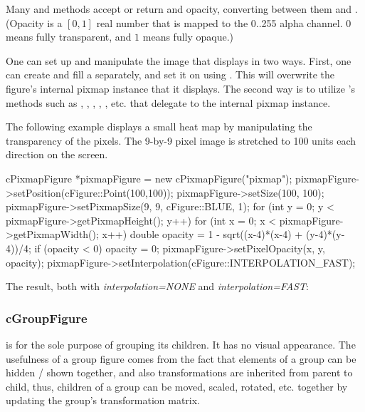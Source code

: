 Many  and  methods accept or return
 and opacity, converting between them and
. (Opacity is a $[0,1]$ real number that is mapped to the
0..255 alpha channel. $0$ means fully transparent, and $1$ means fully
opaque.)

One can set up and manipulate the image that  displays
in two ways. First, one can create and fill a 
separately, and set it on  using .
This will overwrite the figure's internal pixmap instance that it displays.
The second way is to utilize 's methods such as
, , ,
, , etc. that delegate to
the internal pixmap instance.

The following example displays a small heat map by manipulating the
transparency of the pixels. The 9-by-9 pixel image is stretched to
100 units each direction on the screen.

\begin{cpp}
cPixmapFigure *pixmapFigure = new cPixmapFigure("pixmap");
pixmapFigure->setPosition(cFigure::Point(100,100));
pixmapFigure->setSize(100, 100);
pixmapFigure->setPixmapSize(9, 9, cFigure::BLUE, 1);
for (int y = 0; y < pixmapFigure->getPixmapHeight(); y++) {
    for (int x = 0; x < pixmapFigure->getPixmapWidth(); x++) {
        double opacity = 1 - sqrt((x-4)*(x-4) + (y-4)*(y-4))/4;
        if (opacity < 0) opacity = 0;
        pixmapFigure->setPixelOpacity(x, y, opacity);
    }
}
pixmapFigure->setInterpolation(cFigure::INTERPOLATION_FAST);
\end{cpp}


The result, both with \textit{interpolation=NONE} and \textit{interpolation=FAST}:

\begin{center}
\end{center}


\subsubsection{cGroupFigure}
\label{sec:graphics:groupfigure}

 is for the sole purpose of grouping its children. It
has no visual appearance. The usefulness of a group figure comes from the
fact that elements of a group can be hidden / shown together, and also
transformations are inherited from parent to child, thus, children of a
group can be moved, scaled, rotated, etc. together by updating the group's
transformation matrix.

